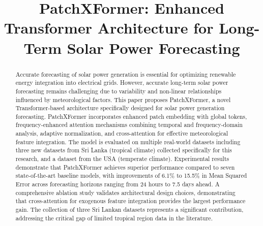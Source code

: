 \documentclass[conference]{IEEEtran}
\begin{document}
\title{PatchXFormer: Enhanced Transformer Architecture for Long-Term Solar Power Forecasting}

\author{
\and
{}
}

\maketitle

\begin{abstract}
Accurate forecasting of solar power generation is essential for optimizing renewable energy integration into electrical grids. However, accurate long-term solar power forecasting remains challenging due to variability and non-linear relationships influenced by meteorological factors. This paper proposes PatchXFormer, a novel Transformer-based architecture specifically designed for solar power generation forecasting. PatchXFormer incorporates enhanced patch embedding with global tokens, frequency-enhanced attention mechanisms combining temporal and frequency-domain analysis, adaptive normalization, and cross-attention for effective meteorological feature integration. The model is evaluated on multiple real-world datasets including three new datasets from Sri Lanka (tropical climate) collected specifically for this research, and a dataset from the USA (temperate climate). Experimental results demonstrate that PatchXFormer achieves superior performance compared to seven state-of-the-art baseline models, with improvements of 6.1\% to 15.5\% in Mean Squared Error across forecasting horizons ranging from 24 hours to 7.5 days ahead. A comprehensive ablation study validates architectural design choices, demonstrating that cross-attention for exogenous feature integration provides the largest performance gain. The collection of three Sri Lankan datasets represents a significant contribution, addressing the critical gap of limited tropical region data in the literature.
\end{abstract}
\end{document}
